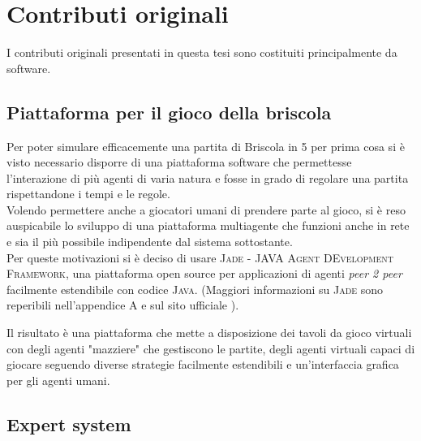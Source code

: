 
\section{Contributi originali}
I contributi originali presentati in questa tesi sono costituiti principalmente da software.
\subsection{Piattaforma per il gioco della briscola}
Per poter simulare efficacemente una partita di Briscola in 5 per prima cosa si è visto necessario disporre di una piattaforma software che permettesse l'interazione di più agenti di varia natura e fosse in grado di regolare una partita rispettandone i tempi e le regole.\\
Volendo permettere anche a giocatori umani di prendere parte al gioco, si è reso auspicabile lo sviluppo di una piattaforma multiagente che funzioni anche in rete e sia il più possibile indipendente dal sistema sottostante.\\
Per queste motivazioni si è deciso di usare \textsc{Jade - JAVA Agent DEvelopment Framework}, una piattaforma open source per applicazioni di agenti \emph{peer 2 peer} facilmente estendibile con codice \textsc{Java}.
(Maggiori informazioni su \textsc{Jade} sono reperibili nell'appendice A e sul sito ufficiale \cite{jade}).

Il risultato è una piattaforma che mette a disposizione dei tavoli da gioco virtuali con degli agenti "mazziere" che gestiscono le partite, degli agenti virtuali capaci di giocare seguendo diverse strategie facilmente estendibili e un'interfaccia grafica per gli agenti umani.

\subsection{Expert system}

